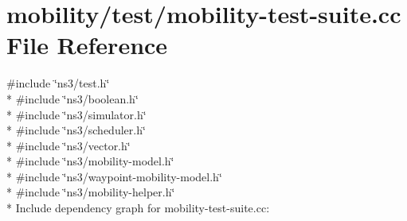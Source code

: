\hypertarget{mobility-test-suite_8cc}{}\section{mobility/test/mobility-\/test-\/suite.cc File Reference}
\label{mobility-test-suite_8cc}
{\ttfamily \#include \char`\"{}ns3/test.\+h\char`\"{}}\\*
{\ttfamily \#include \char`\"{}ns3/boolean.\+h\char`\"{}}\\*
{\ttfamily \#include \char`\"{}ns3/simulator.\+h\char`\"{}}\\*
{\ttfamily \#include \char`\"{}ns3/scheduler.\+h\char`\"{}}\\*
{\ttfamily \#include \char`\"{}ns3/vector.\+h\char`\"{}}\\*
{\ttfamily \#include \char`\"{}ns3/mobility-\/model.\+h\char`\"{}}\\*
{\ttfamily \#include \char`\"{}ns3/waypoint-\/mobility-\/model.\+h\char`\"{}}\\*
{\ttfamily \#include \char`\"{}ns3/mobility-\/helper.\+h\char`\"{}}\\*
Include dependency graph for mobility-\/test-\/suite.cc\+:

